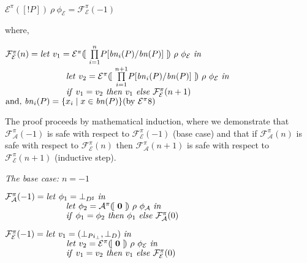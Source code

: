 \documentclass[10pt,a4paper,final,oneside,fleqn]{book}
\begin{document}
\noindent
$\mathcal{E}^\pi(\![!P]\!)~\rho~\phi_\mathcal{E}=\mathcal{F}_\mathcal{E}^\pi(-1)$

\noindent
where,

\noindent
$\mathcal{F}_\mathcal{E}^\pi(n)=\mbox{{\itshape let\/} }v_1=\mathcal{E}^\pi(\![~\underset{i=1}{\overset{n}{\prod}}P[\mbox{{\itshape bn\/}}_i(P)/\mbox{{\itshape bn\/}}(P)]~]\!)~\rho~\phi_\mathcal{E}\mbox{ {\itshape in\/}}$\\
$\hspace{25mm}\mbox{{\itshape let\/} }v_2=\mathcal{E}^\pi(\![~\underset{i=1}{\overset{n+1}{\prod}}P[\mbox{{\itshape bn\/}}_i(P)/\mbox{{\itshape bn\/}}(P)]~]\!)~\rho~\phi_\mathcal{E}\mbox{ {\itshape in\/}}$\\
$\hspace{25mm}\mbox{{\itshape if\/} }v_1=v_2\mbox{ {\itshape then\/} }v_1\mbox{ {\itshape else\/} }\mathcal{F}_\mathcal{E}^\pi(n+1)$\\
$\mbox{and, }\mbox{{\itshape bn\/}}_i(P)=\{x_i\mid x\in\mbox{{\itshape bn\/}}(P)\}\hfill(\mbox{by }\mathcal{E}^{\pi}8)$\vspace{5mm}

\noindent
The proof proceeds by mathematical induction, where we demonstrate that $\mathcal{F}_\mathcal{A}^\pi(-1)$ is safe with respect to $\mathcal{F}_\mathcal{E}^\pi(-1)$ (base case) and that if $\mathcal{F}_\mathcal{A}^\pi(n)$ is safe with respect to $\mathcal{F}_\mathcal{E}^\pi(n)$ then $\mathcal{F}_\mathcal{A}^\pi(n+1)$ is safe with respect to $\mathcal{F}_\mathcal{E}^\pi(n+1)$ (inductive step).\vspace{5mm}

\noindent
{\itshape The base case: $n=-1$\/}\vspace{5mm}

\noindent
$\mathcal{F}_\mathcal{A}^\pi(-1)=\mbox{{\itshape let\/} }\phi_1=\bot_{D^\sharp}\mbox{ {\itshape in\/}}$\\
$\hspace{25mm}\mbox{{\itshape let\/} }\phi_2=\mathcal{A}^\pi(\![~{\bf 0}~]\!)~\rho~\phi_\mathcal{A}\mbox{ {\itshape in\/}}$\\
$\hspace{25mm}\mbox{{\itshape if\/} }\phi_1=\phi_2\mbox{ {\itshape then\/} }\phi_1\mbox{ {\itshape else\/} }\mathcal{F}_\mathcal{A}^\pi(0)$\vspace{5mm}

\noindent
$\mathcal{F}_\mathcal{E}^\pi(-1)=\mbox{{\itshape let\/} }v_1=(\bot_{Pi_\bot},\bot_{D})\mbox{ {\itshape in\/}}$\\
$\hspace{25mm}\mbox{{\itshape let\/} }v_2=\mathcal{E}^\pi(\![~{\bf 0}~]\!)~\rho~\phi_\mathcal{E}\mbox{ {\itshape in\/}}$\\
$\hspace{25mm}\mbox{{\itshape if\/} }v_1=v_2\mbox{ {\itshape then\/} }v_1\mbox{ {\itshape else\/} }\mathcal{F}_\mathcal{E}^\pi(0)$\vspace{5mm}
\end{document}
